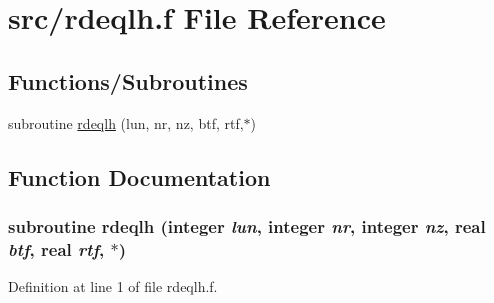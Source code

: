 \hypertarget{rdeqlh_8f}{
\section{src/rdeqlh.f File Reference}
\label{rdeqlh_8f}
}
\subsection*{Functions/Subroutines}
\begin{CompactItemize}
\item 
subroutine \hyperlink{rdeqlh_8f_e0daa57ce3675154c0bdbf0ab47fc742}{rdeqlh} (lun, nr, nz, btf, rtf,$\ast$)
\end{CompactItemize}


\subsection{Function Documentation}
\hypertarget{rdeqlh_8f_e0daa57ce3675154c0bdbf0ab47fc742}{
\subsubsection[rdeqlh]{\setlength{\rightskip}{0pt plus 5cm}subroutine rdeqlh (integer {\em lun}, \/  integer {\em nr}, \/  integer {\em nz}, \/  real {\em btf}, \/  real {\em rtf}, \/  $\ast$)}}
\label{rdeqlh_8f_e0daa57ce3675154c0bdbf0ab47fc742}




Definition at line 1 of file rdeqlh.f.